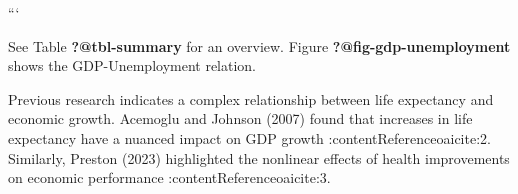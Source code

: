 \documentclass[
  letterpaper,
  DIV=11,
  numbers=noendperiod]{scrartcl}
\begin{document}
```

See Table \textbf{?@tbl-summary} for an overview. Figure
\textbf{?@fig-gdp-unemployment} shows the GDP-Unemployment relation.

Previous research indicates a complex relationship between life
expectancy and economic growth. Acemoglu and Johnson (2007) found that
increases in life expectancy have a nuanced impact on GDP growth
:contentReference{oaicite:2}. Similarly, Preston (2023) highlighted the
nonlinear effects of health improvements on economic performance
:contentReference{oaicite:3}.
\end{document}
